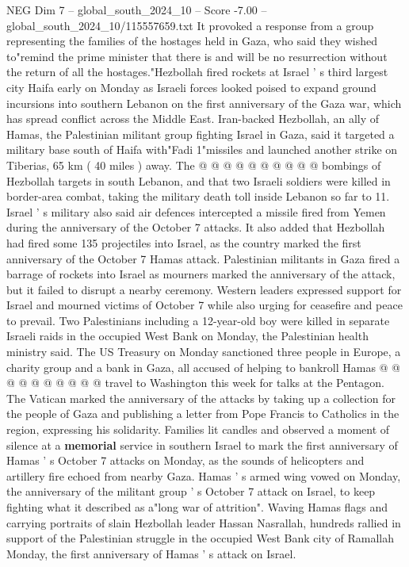 \begin{textsample}{NEG Dim 7 – global\_south\_2024\_10 – Score -7.00 – global\_south\_2024\_10/115557659.txt}
It provoked a response from a group representing the families of the hostages held in Gaza, who said they wished to"remind the prime minister that there is and will be no resurrection without the return of all the hostages."Hezbollah fired rockets at Israel ' s third largest city Haifa early on Monday as Israeli forces looked poised to expand ground incursions into southern Lebanon on the first anniversary of the Gaza war, which has spread conflict across the Middle East.
Iran-backed Hezbollah, an ally of Hamas, the Palestinian militant group fighting Israel in Gaza, said it targeted a military base south of Haifa with"Fadi 1"missiles and launched another strike on Tiberias, 65 km ( 40 miles ) away.
The @ @ @ @ @ @ @ @ @ @ bombings of Hezbollah targets in south Lebanon, and that two Israeli soldiers were killed in border-area combat, taking the military death toll inside Lebanon so far to 11.
Israel ' s military also said air defences intercepted a missile fired from Yemen during the anniversary of the October 7 attacks.
It also added that Hezbollah had fired some 135 projectiles into Israel, as the country marked the first anniversary of the October 7 Hamas attack.
Palestinian militants in Gaza fired a barrage of rockets into Israel as mourners marked the anniversary of the attack, but it failed to disrupt a nearby ceremony.
Western leaders expressed support for Israel and mourned victims of October 7 while also urging for ceasefire and peace to prevail.
Two Palestinians including a 12-year-old boy were killed in separate Israeli raids in the occupied West Bank on Monday, the Palestinian health ministry said.
The US Treasury on Monday sanctioned three people in Europe, a charity group and a bank in Gaza, all accused of helping to bankroll Hamas @ @ @ @ @ @ @ @ @ @ travel to Washington this week for talks at the Pentagon.
The Vatican marked the anniversary of the attacks by taking up a collection for the people of Gaza and publishing a letter from Pope Francis to Catholics in the region, expressing his solidarity.
Families lit candles and observed a moment of silence at a \textbf{memorial} service in southern Israel to mark the first anniversary of Hamas ' s October 7 attacks on Monday, as the sounds of helicopters and artillery fire echoed from nearby Gaza.
Hamas ' s armed wing vowed on Monday, the anniversary of the militant group ' s October 7 attack on Israel, to keep fighting what it described as a"long war of attrition".
Waving Hamas flags and carrying portraits of slain Hezbollah leader Hassan Nasrallah, hundreds rallied in support of the Palestinian struggle in the occupied West Bank city of Ramallah Monday, the first anniversary of Hamas ' s attack on Israel.

\end{textsample}
